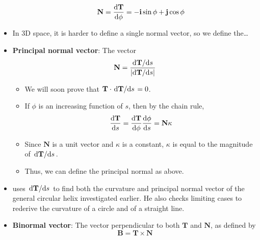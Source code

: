 \documentclass[../main.tex]{subfiles}
\begin{document}
\begin{itemize}
\begin{itemize}
        \begin{equation*}
            \textbf{N} = \dv{\textbf{T}}{\phi} = -\textbf{i}\sin\phi+\textbf{j}\cos\phi
        \end{equation*}
    \end{itemize}
    \item In 3D space, it is harder to define a single normal vector, so we define the\dots
    \item \textbf{Principal normal vector}: The vector
    \begin{equation*}
        \textbf{N} = \frac{\dv*{\textbf{T}}{s}}{|\text{d}\textbf{T}/\text{d}s|}
    \end{equation*}
    \begin{itemize}
        \item We will soon prove that $\textbf{T}\cdot\dv*{\textbf{T}}{s}=0$.
        \item If $\phi$ is an increasing function of $s$, then by the chain rule,
        \begin{equation*}
            \dv{\textbf{T}}{s} = \dv{\textbf{T}}{\phi}\dv{\phi}{s} = \textbf{N}\kappa
        \end{equation*}
        \item Since $\textbf{N}$ is a unit vector and $\kappa$ is a constant, $\kappa$ is equal to the magnitude of $\dv*{\textbf{T}}{s}$.
        \item Thus, we can define the principal normal as above.
    \end{itemize}
    \item \cite{bib:Thomas} uses $\dv*{\textbf{T}}{s}$ to find both the curvature and principal normal vector of the general circular helix investigated earlier. He also checks limiting cases to rederive the curvature of a circle and of a straight line.
    \item \textbf{Binormal vector}: The vector perpendicular to both $\textbf{T}$ and $\textbf{N}$, as defined by
    \begin{equation*}
        \textbf{B} = \textbf{T}\times\textbf{N}
    \end{equation*}
\end{itemize}
\end{document}

